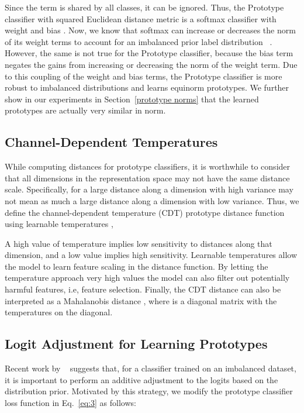\documentclass{article}
\begin{document}
Since the term  is shared by all classes, it can be ignored. Thus, the Prototype classifier with squared Euclidean distance metric is a softmax classifier with weight  and bias . 
Now, we know that softmax can increase or decreases the norm of its weight terms to account for an imbalanced prior label distribution ~\cite{kang2019decoupling}. However, the same is not true for the Prototype classifier, because the bias term negates the gains from increasing or decreasing the norm of the weight term. Due to this coupling of the weight and bias terms, the Prototype classifier is more robust to imbalanced distributions and learns equinorm prototypes. We further show in our experiments in Section~\ref{prototype norms} that the learned prototypes
are actually very similar in norm. 

\subsection{Channel-Dependent Temperatures}
\label{cdt}
While computing distances for prototype classifiers, it is worthwhile to consider that all dimensions in the representation space may not have the same distance scale. Specifically, for a large distance along a dimension with high variance may not mean as much a large distance along a dimension with low variance. Thus, we define the channel-dependent temperature (CDT) prototype distance function using learnable temperatures ,

A high value of temperature  implies low sensitivity to distances along that dimension, and a low value implies high sensitivity. Learnable temperatures allow the model to learn feature scaling in the distance function. By letting the temperature approach very high values the model can also filter out potentially harmful features, i.e, feature selection. Finally, the CDT distance can also be interpreted as a Mahalanobis distance , where  is a diagonal matrix with the temperatures on the diagonal. 

\subsection{Logit Adjustment for Learning Prototypes}
\label{la}
Recent work by ~\cite{menon2020long} suggests that, for a classifier trained on an imbalanced dataset, it is important to perform an additive adjustment to the logits based on the distribution prior. Motivated by this strategy, we modify the prototype classifier loss function in Eq.~\ref{eq:3} as follows:
\end{document}

